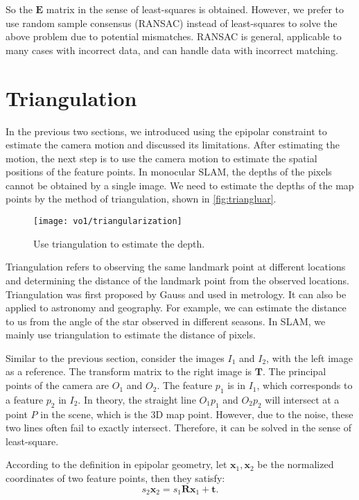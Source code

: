 So the $\mathbf{E}$ matrix in the sense of least-squares is obtained. However, we prefer to use random sample consensus (RANSAC) instead of least-squares to solve the above problem due to potential mismatches. RANSAC is general, applicable to many cases with incorrect data, and can handle data with incorrect matching.

\section{Triangulation}
\label{sec:7.5}
In the previous two sections, we introduced using the epipolar constraint to estimate the camera motion and discussed its limitations. After estimating the motion, the next step is to use the camera motion to estimate the spatial positions of the feature points. In monocular SLAM, the depths of the pixels cannot be obtained by a single image. We need to estimate the depths of the map points by the method of triangulation, shown in \autoref{fig:triangluar}.

\begin{figure}[!ht]
	\centering
	\texttt{[image: vo1/triangularization]}
	\caption{Use triangulation to estimate the depth.}
	\label{fig:triangluar}
\end{figure}

Triangulation refers to observing the same landmark point at different locations and determining the distance of the landmark point from the observed locations. Triangulation was first proposed by Gauss and used in metrology. It can also be applied to astronomy and geography. For example, we can estimate the distance to us from the angle of the star observed in different seasons. In SLAM, we mainly use triangulation to estimate the distance of pixels.

Similar to the previous section, consider the images $I_{1}$ and $I_{2}$, with the left image as a reference. The transform matrix to the right image is $\mathbf{T}$. The principal points of the camera are $O_{1}$ and $O_{2}$. The feature $p_{1}$ is in $I_{1}$, which corresponds to a feature $p_{2}$ in $I_{2}$. In theory, the straight line $O_{1}p_{1}$ and $O_{2}p_{2}$ will intersect at a point $P$ in the scene, which is the 3D map point. However, due to the noise, these two lines often fail to exactly intersect. Therefore, it can be solved in the sense of least-square.

According to the definition in epipolar geometry, let $\mathbf{x}_1, \mathbf{x}_2$ be the normalized coordinates of two feature points, then they satisfy:
\begin{equation}
s_2 \mathbf{x}_2 = s_1  \mathbf{R} \mathbf{x}_1 + \mathbf{t}.  
\end{equation}

